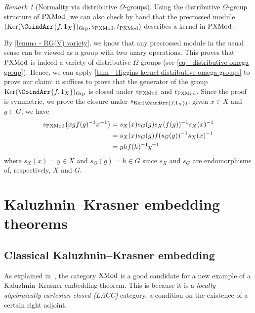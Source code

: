 \documentclass[a4paper, british, reqno]{amsart}
\DeclareMathOperator{\Ker}{Ker} %
\renewcommand*{\and}{,}
\renewcommand*{\and}{,}
\newcommand*{\CatName}[1]{\textnormal{#1}}
\newcommand*{\CondName}[1]{\textnormal{(#1)}}
\newcommand*{\Grp}{\CatName{Grp}}
\newcommand*{\PXMod}{\CatName{PXMod}}
\newcommand*{\XMod}{\CatName{XMod}}
\newcommand*{\LACC}{\CondName{LACC}}
\theoremstyle{definition}
\theoremstyle{remark}
\newtheorem{remark}[theorem]{Remark}
\begin{document}
\begin{remark}[Normality via distributive \(\Omega\)-groups]
	Using the distributive \(\Omega\)-group structure of \(\PXMod\), we can also check by hand that the precrossed module \((\Ker(\CoindArr{f\and 1_X})_\Grp, s_{\PXMod}, t_{\PXMod})\) describes a kernel in \(\PXMod\).

	By \cref{lemma - RG(V) variety}, we know that any precrossed module in the usual sense can be viewed as a group with two unary operations. This proves that \(\PXMod\) is indeed a variety of distributive \(\Omega\)-groups (see \eqref{eq - distributive omega group}). Hence, we can apply \cref{thm - Higgins kernel distributive omega groups} to prove our claim: it suffices to prove that the generator of the group \(\Ker(\CoindArr{f\and 1_X})_\Grp\) is closed under \(s_{\PXMod}\) and \(t_{\PXMod}\). Since the proof is symmetric, we prove the closure under \(s_{\Ker(\CoindArr{f\and 1_X})}\): given \(x\in X\) and \(g\in G\), we have
	\[
		\begin{split}
			s_{\PXMod}\bigl(xgf(g)^{-1}x^{-1}\bigr) & =s_X(x)s_G(g)s_X(f(g))^{-1}s_X(x)^{-1} \\
			                                        & =s_X(x)s_G(g)f(s_G(g))^{-1}s_X(x)^{-1} \\
			                                        & = yhf(h)^{-1}y^{-1}
		\end{split}
	\]
	where \(s_X(x)=y\in X\) and \(s_G(g)=h\in G\) since \(s_X\) and \(s_G\) are endomorphisms of, respectively, \(X\) and \(G\).
\end{remark}



\section{Kaluzhnin--Krasner embedding theorems}

\subsection{Classical Kaluzhnin--Krasner embedding}\label{subsec - KK in groups}

As explained in~\cite{DGMVdL}, the category \(\XMod\) is a good candidate for a new example of a Kaluzhnin--Krasner embedding theorem. This is because it is a \emph{locally algebraically cartesian closed \LACC{}} category, a condition on the existence of a certain right adjoint.
\end{document}
